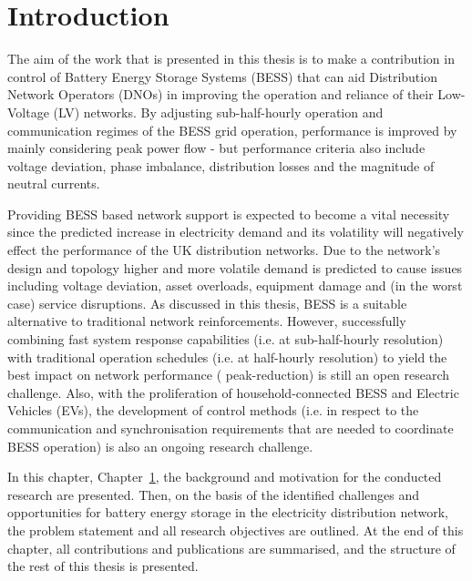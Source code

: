 \chapter{Introduction}
\label{ch-introduction}

The aim of the work that is presented in this thesis is to make a contribution in control of Battery Energy Storage Systems (BESS) that can aid Distribution Network Operators (DNOs) in improving the operation and reliance of their Low-Voltage (LV) networks.
By adjusting sub-half-hourly operation and communication regimes of the BESS grid operation, performance is improved by mainly considering peak power flow - but performance criteria also include voltage deviation, phase imbalance, distribution losses and the magnitude of neutral currents.

Providing BESS based network support is expected to become a vital necessity since the predicted increase in electricity demand and its volatility will negatively effect the performance of the UK distribution networks.
Due to the network's design and topology higher and more volatile demand is predicted to cause issues including voltage deviation, asset overloads, equipment damage and (in the worst case) service disruptions.
As discussed in this thesis, BESS is a suitable alternative to traditional network reinforcements.
However, successfully combining fast system response capabilities (i.e. at sub-half-hourly resolution) with traditional operation schedules (i.e. at half-hourly resolution) to yield the best impact on network performance ( peak-reduction) is still an open research challenge.
Also, with the proliferation of household-connected BESS and Electric Vehicles (EVs), the development of control methods (i.e. in respect to the communication and synchronisation requirements that are needed to coordinate BESS operation) is also an ongoing research challenge.

In this chapter, Chapter~\ref{ch-introduction}, the background and motivation for the conducted research are presented.
Then, on the basis of the identified challenges and opportunities for battery energy storage in the electricity distribution network, the problem statement and all research objectives are outlined.
At the end of this chapter, all contributions and publications are summarised, and the structure of the rest of this thesis is presented.









